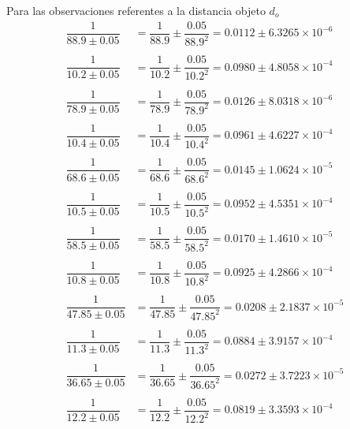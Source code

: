 \documentclass[a4paper, 10pt]{article}
\begin{document}
	Para las observaciones referentes a la distancia objeto $d_o$
	\begin{align*}
		\dfrac{1}{88.9\pm 0.05}&=\dfrac{1}{88.9}\pm\dfrac{0.05}{88.9^2}=0.0112\pm6.3265\times10^{-6}\\\\
		\dfrac{1}{10.2\pm 0.05}&=\dfrac{1}{10.2}\pm\dfrac{0.05}{10.2^2}=0.0980\pm4.8058\times10^{-4}\\\\
		\dfrac{1}{78.9\pm 0.05}&=\dfrac{1}{78.9}\pm\dfrac{0.05}{78.9^2}=0.0126\pm8.0318\times10^{-6}\\\\
		\dfrac{1}{10.4\pm 0.05}&=\dfrac{1}{10.4}\pm\dfrac{0.05}{10.4^2}=0.0961\pm4.6227\times10^{-4}\\\\
		\dfrac{1}{68.6\pm 0.05}&=\dfrac{1}{68.6}\pm\dfrac{0.05}{68.6^2}=0.0145\pm1.0624\times10^{-5}\\\\
		\dfrac{1}{10.5\pm 0.05}&=\dfrac{1}{10.5}\pm\dfrac{0.05}{10.5^2}=0.0952\pm4.5351\times10^{-4}\\\\
		\dfrac{1}{58.5\pm 0.05}&=\dfrac{1}{58.5}\pm\dfrac{0.05}{58.5^2}=0.0170\pm1.4610\times10^{-5}\\\\
		\dfrac{1}{10.8\pm 0.05}&=\dfrac{1}{10.8}\pm\dfrac{0.05}{10.8^2}=0.0925\pm4.2866\times10^{-4}\\\\
		\dfrac{1}{47.85\pm 0.05}&=\dfrac{1}{47.85}\pm\dfrac{0.05}{47.85^2}=0.0208\pm2.1837\times10^{-5}\\\\
		\dfrac{1}{11.3\pm 0.05}&=\dfrac{1}{11.3}\pm\dfrac{0.05}{11.3^2}=0.0884\pm3.9157\times10^{-4}\\\\
		\dfrac{1}{36.65\pm 0.05}&=\dfrac{1}{36.65}\pm\dfrac{0.05}{36.65^2}=0.0272\pm3.7223\times10^{-5}\\\\
		\dfrac{1}{12.2\pm 0.05}&=\dfrac{1}{12.2}\pm\dfrac{0.05}{12.2^2}=0.0819\pm3.3593\times10^{-4}\\\\
	\end{align*}
\end{document}
